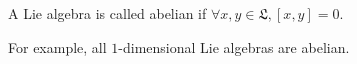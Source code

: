 A Lie algebra is called abelian if $\forall x, y \in \mathfrak{L}, [x, y] = 0$.

For example, all $1$-dimensional Lie algebras are abelian.
